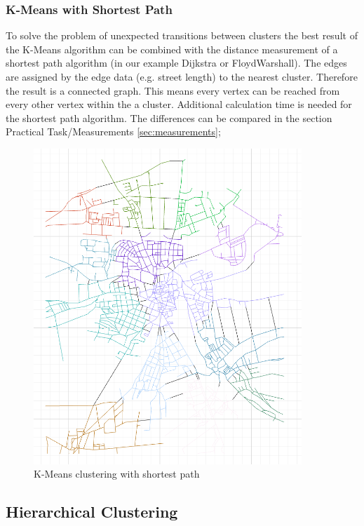 \documentclass[11pt, a4paper]{report}
\begin{document}
\subsubsection{K-Means with Shortest Path}
To solve the problem of unexpected transitions between clusters the best result of the K-Means algorithm can be combined with the distance measurement of a shortest path algorithm (in our example Dijkstra or FloydWarshall). The edges are assigned by the edge data (e.g. street length) to the nearest cluster. Therefore the result is a connected graph. This means every vertex can be reached from every other vertex within the a cluster.
\newline
Additional calculation time is needed for the shortest path algorithm. The differences can be compared in the section Practical Task/Measurements \ref{sec:measurements};

\begin{figure}[!h]
    \centering
    \includegraphics[width=0.9\textwidth]{clusteranalysis_kmeansExt_result.png}
    \caption{K-Means clustering with shortest path\label{fig:Kmeansshortestp}}
\end{figure}



\pagebreak
\subsection{Hierarchical Clustering}
\end{document}
